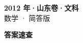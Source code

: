 \documentclass[zihao=-4, a4paper]{ctexart}
\begin{document}
\begin{center}
  {\Large\bfseries 2012 年·山东卷·文科}\\[4pt]
  {\large 数学 · 简答版}
\end{center}
\medskip
{}

\clearpage
{}
\begin{center}{\Large\bfseries 答案速查}\end{center}
\medskip

\end{document}

